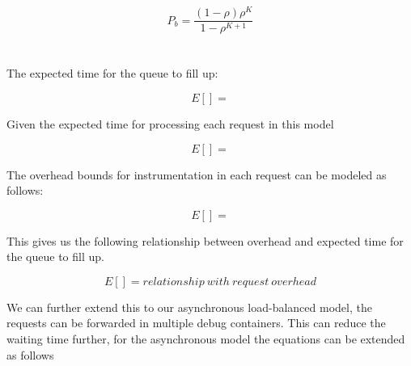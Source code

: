 \begin{equation}
P_{b} = \frac{(1-\rho)\rho^{K}}{1-\rho^{K+1}}
\end{equation}
\\ \\

The expected time for the queue to fill up:

\begin{equation}
E[] =
\end{equation}

Given the expected time for processing each request in this model

\begin{equation}
E[] =
\end{equation}

The overhead bounds for instrumentation in each request can be modeled as follows:

\begin{equation}
E[] = 
\end{equation}

This gives us the following relationship between overhead and expected time for the queue to fill up.

\begin{equation}
E[] = relationship\ with\ request\ overhead
\end{equation}


We can further extend this to our asynchronous load-balanced model, the requests can be forwarded in multiple debug containers.
This can reduce the waiting time further, for the asynchronous model the equations can be extended as follows\\ \\
\fi

